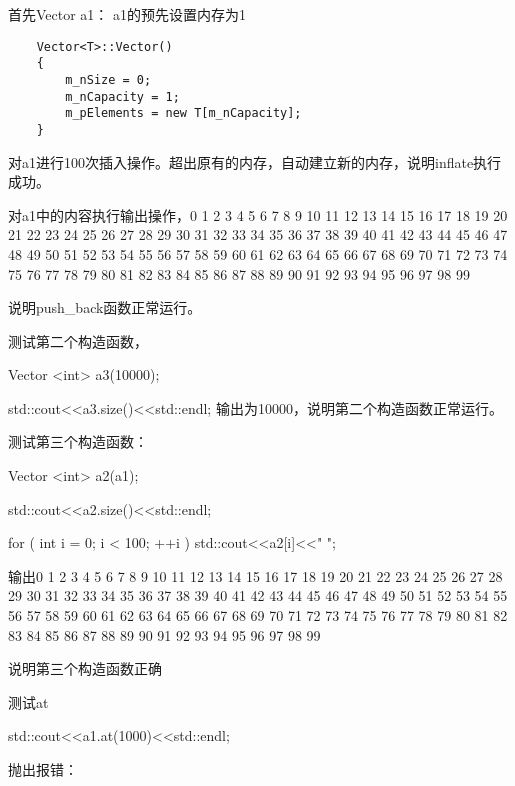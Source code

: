 \documentclass{ctexart} %
\begin{document}
首先Vector a1：
a1的预先设置内存为1
\begin{lstlisting}
    Vector<T>::Vector()
    {
        m_nSize = 0;                   
        m_nCapacity = 1;             
        m_pElements = new T[m_nCapacity]; 
    }
\end{lstlisting}
对a1进行100次插入操作。超出原有的内存，自动建立新的内存，说明inflate执行成功。

对a1中的内容执行输出操作，0 1 2 3 4 5 6 7 8 9 10 11 12 13 14 15 16 17 18 19 20 21 22 23 24 25 26 27 28 29 30 31 32 33 34 35 36 37 38 39 40 41 42 43 44 45 46 47 48 49 50 51 52 53 54 55 56 57 58 59 60 61 62 63 64 65 66 67 68 69 70 71 72 73 74 75 76 77 78 79 80 81 82 83 84 85 86 87 88 89 90 91 92 93 94 95 96 97 98 99


\vspace{10pt}

说明push\_back函数正常运行。\

测试第二个构造函数，
\vspace*{1pt}

Vector <int> a3(10000);
\vspace*{1pt}

std::cout<<a3.size()<<std::endl;
\vspace*{1pt}
输出为10000，说明第二个构造函数正常运行。

测试第三个构造函数：
\vspace*{1pt}

Vector <int> a2(a1);
\vspace*{1pt}

std::cout<<a2.size()<<std::endl;
\vspace*{1pt}

for ( int i = 0; i < 100; ++i )
{
    std::cout<<a2[i]<<" ";
}
\vspace*{1pt}

输出0 1 2 3 4 5 6 7 8 9 10 11 12 13 14 15 16 17 18 19 20 21 22 23 24 25 26 27 28 29 30 31 32 33 34 35 36 37 38 39 40 41 42 43 44 45 46 47 48 49 50 51 52 53 54 55 56 57 58 59 60 61 62 63 64 65 66 67 68 69 70 71 72 73 74 75 76 77 78 79 80 81 82 83 84 85 86 87 88 89 90 91 92 93 94 95 96 97 98 99

说明第三个构造函数正确

测试at
\vspace*{1pt}

std::cout<<a1.at(1000)<<std::endl;
\vspace*{1pt}

抛出报错：
\vspace{10pt}
\end{document}
